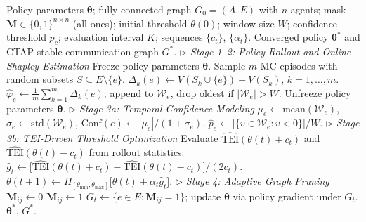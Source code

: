\documentclass{article}
\begin{document}
\begin{algorithm}[H]
\caption{CTAP: Confidence-Guided TEI-Maximizing Adaptive Pruning}
\label{algo:CTAP}
\begin{algorithmic}[1]
\REQUIRE Policy parameters $\boldsymbol{\theta}$; fully connected graph $G_0=(A,E)$ with $n$ agents; mask $\mathbf{M}\in\{0,1\}^{n\times n}$ (all ones); initial threshold $\theta(0)$; window size $W$; confidence threshold $p_c$; evaluation interval $K$; sequences $\{c_t\}$, $\{\alpha_t\}$.
\ENSURE Converged policy $\boldsymbol{\theta}^*$ and CTAP-stable communication graph $G^*$.
        \STATE $\triangleright$ \textit{Stage 1--2: Policy Rollout and Online Shapley Estimation}
        \STATE Freeze policy parameters $\boldsymbol{\theta}$.
            \STATE Sample $m$ MC episodes with random subsets $S \subseteq E \setminus \{e\}$.
            \STATE $\Delta_k(e) \leftarrow V(S_k \cup \{e\}) - V(S_k)$,\; $k = 1, \ldots, m$.
            \STATE $\hat{\varphi}_e \leftarrow \frac{1}{m}\sum_{k=1}^{m} \Delta_k(e)$;\; append to $\mathcal{W}_e$, drop oldest if $|\mathcal{W}_e| > W$.
        \ENDFOR
        \STATE Unfreeze policy parameters $\boldsymbol{\theta}$.
    \ENDIF
    \STATE $\triangleright$ \textit{Stage 3a: Temporal Confidence Modeling}
        \STATE $\mu_e \leftarrow \mathrm{mean}(\mathcal{W}_e)$,\; $\sigma_e \leftarrow \mathrm{std}(\mathcal{W}_e)$,\; $\mathrm{Conf}(e) \leftarrow |\mu_e| / (1 + \sigma_e)$.
        \STATE $\hat{p}_e \leftarrow |\{v \in \mathcal{W}_e : v < 0\}| / W$.
    \ENDFOR
    \STATE $\triangleright$ \textit{Stage 3b: TEI-Driven Threshold Optimization}
    \STATE Evaluate $\widehat{\mathrm{TEI}}(\theta(t) + c_t)$ and $\widehat{\mathrm{TEI}}(\theta(t) - c_t)$ from rollout statistics.
    \STATE $\hat{g}_t \leftarrow \bigl[\widehat{\mathrm{TEI}}(\theta(t)+c_t) - \widehat{\mathrm{TEI}}(\theta(t)-c_t)\bigr] / (2c_t)$.
    \STATE $\theta(t+1) \leftarrow \Pi_{[\theta_{\min},\theta_{\max}]}\bigl[\theta(t) + \alpha_t \hat{g}_t\bigr]$.
    \STATE $\triangleright$ \textit{Stage 4: Adaptive Graph Pruning}
            \STATE $\mathbf{M}_{ij} \leftarrow 0$ 
        \ELSE
            \STATE $\mathbf{M}_{ij} \leftarrow 1$ 
        \ENDIF
    \ENDFOR
    \STATE $G_t \leftarrow \{e \in E : \mathbf{M}_{ij} = 1\}$;\; update $\boldsymbol{\theta}$ via policy gradient under $G_t$.
\ENDFOR
\RETURN $\boldsymbol{\theta}^*$,\; $G^*$.
\end{algorithmic}
\end{algorithm}
\end{document}
